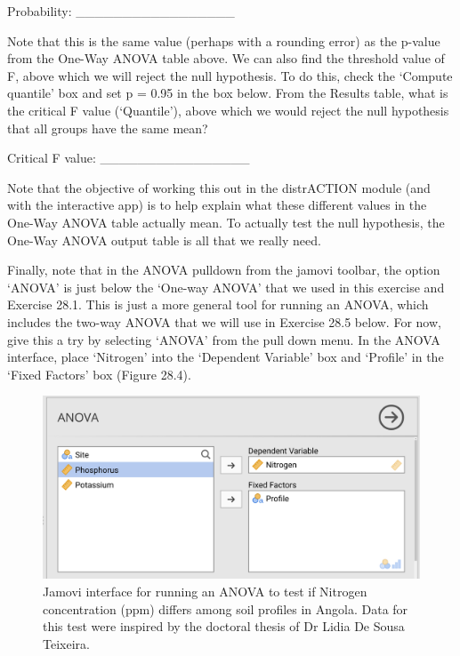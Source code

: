 \documentclass[
]{scrbook}
\begin{document}
Probability: \_\_\_\_\_\_\_\_\_\_\_\_\_\_\_\_\_

Note that this is the same value (perhaps with a rounding error) as the p-value from the One-Way ANOVA table above.
We can also find the threshold value of F, above which we will reject the null hypothesis.
To do this, check the `Compute quantile' box and set p = 0.95 in the box below.
From the Results table, what is the critical F value (`Quantile'), above which we would reject the null hypothesis that all groups have the same mean?

Critical F value: \_\_\_\_\_\_\_\_\_\_\_\_\_\_\_\_

Note that the objective of working this out in the distrACTION module (and with the interactive app) is to help explain what these different values in the One-Way ANOVA table actually mean.
To actually test the null hypothesis, the One-Way ANOVA output table is all that we really need.

Finally, note that in the ANOVA pulldown from the jamovi toolbar, the option `ANOVA' is just below the `One-way ANOVA' that we used in this exercise and Exercise 28.1.
This is just a more general tool for running an ANOVA, which includes the two-way ANOVA that we will use in Exercise 28.5 below.
For now, give this a try by selecting `ANOVA' from the pull down menu.
In the ANOVA interface, place `Nitrogen' into the `Dependent Variable' box and `Profile' in the `Fixed Factors' box (Figure 28.4).

\begin{figure}
\includegraphics[width=1\linewidth]{img/jamovi_ANOVA_input} \caption{Jamovi interface for running an ANOVA to test if Nitrogen concentration (ppm) differs among soil profiles in Angola. Data for this test were inspired by the doctoral thesis of Dr Lidia De Sousa Teixeira.}\label{fig:unnamed-chunk-130}
\end{figure}
\end{document}

